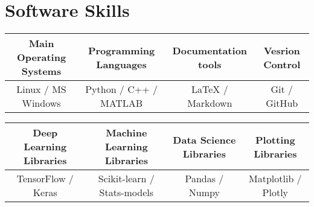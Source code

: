 \documentclass[letterpaper,11pt]{article}
\begin{document}
\section{Software Skills}

\begin{table}[h!]
  \begin{center}
    \label{tab:table1}
    \begin{tabular}{c|c|c|c}
      Main Operating Systems \hspace{5pt} & \hspace{5pt} Programming Languages \hspace{5pt} & \hspace{5pt} Documentation tools \hspace{5pt} & \hspace{5pt} Vesrion Control \\
      \hline
      Linux / MS Windows & Python / C++ / MATLAB & LaTeX / Markdown & Git / GitHub \\
    \end{tabular}
  \end{center}
\end{table}

\vspace{-20pt}

\begin{table}[h!]
  \begin{center}
    \label{tab:table1}
    \begin{tabular}{c|c|c|c}
      Deep Learning Libraries \hspace{5pt} & \hspace{5pt} Machine Learning Libraries \hspace{5pt} & \hspace{5pt} Data Science Libraries \hspace{5pt} & \hspace{5pt} Plotting Libraries \hspace{5pt} \\
      \hline
      TensorFlow / Keras & Scikit-learn / Stats-models & Pandas / Numpy & Matplotlib / Plotly \\
    \end{tabular}
  \end{center}
\end{table}

\vspace{-20pt}
\end{document}
